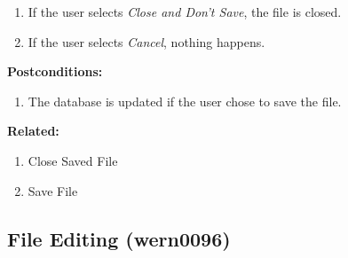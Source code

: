 \documentclass[11pt]{report}
\begin{document}
\begin{framed}
\begin{enumerate}
		\item If the user selects \textit{Close and Don't Save}, the file is closed.
		\item If the user selects \textit{Cancel}, nothing happens.
	\end{enumerate}
	\textbf{Postconditions:}
	\begin{enumerate}
		\item The database is updated if the user chose to save the file.
	\end{enumerate}
	\textbf{Related:} 
	\begin{enumerate}
		\item Close Saved File
		\item Save File
	\end{enumerate}
\end{framed}

\newpage	
		
\subsection{File Editing (wern0096)}
\end{document}
